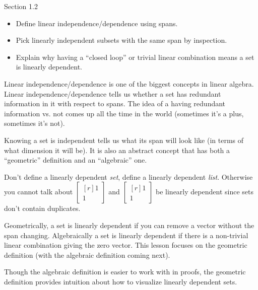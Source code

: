 \documentclass{problemset}
\newcommand{\mat}[1]{\begin{bmatrix*}[r]#1\end{bmatrix*}}
\begin{document}
\begin{lesson}

	Section 1.2

	\begin{itemize}
		\item Define linear independence/dependence using spans.
		\item Pick linearly independent subsets with the same span by inspection.
		\item Explain why having a ``closed loop'' or trivial linear combination
			means a set is linearly dependent.
	\end{itemize}

	Linear independence/dependence is one of the biggest concepts in linear algebra.
	Linear independence/dependence tells us whether a set has redundant information
	in it with respect to spans. The idea of a having redundant information vs\mbox{.}
	not comes up all the time in the world (sometimes it's a plus, sometimes it's not).

	Knowing
	a set is independent tells us what its span will look like (in terms of what dimension
	it will be). It is also an abstract concept that has both a ``geometric'' definition
	and an ``algebraic'' one.
	\begin{annotation}
		\begin{notes}
			Don't define a linearly dependent \emph{set}, define
			a linearly dependent \emph{list}. Otherwise you cannot talk about
			$\mat{1\\1}$ and $\mat{1\\1}$ be linearly dependent since sets don't
			contain duplicates.
		\end{notes}
	\end{annotation}
	Geometrically, a set is linearly dependent if you can remove
	a vector without the span changing. Algebraically a set is linearly dependent if there
	is a non-trivial linear combination giving the zero vector. This lesson focuses on the
	geometric definition (with the algebraic definition coming next).

	Though the algebraic definition is easier to work with in proofs, the geometric definition
	provides intuition about how to visualize linearly
	dependent sets.

\end{lesson}
\end{document}
